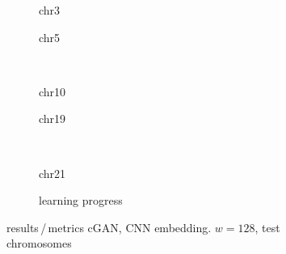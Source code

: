 \begin{figure}[p] %
    \begin{subfigure}{0.45\textwidth}
        \scriptsize
        \caption{chr3}
    \end{subfigure} \hfill
    \begin{subfigure}{0.45\textwidth}
        \scriptsize
        \caption{chr5}
    \end{subfigure}\\[5mm]
    \begin{subfigure}{0.45\textwidth}
        \scriptsize
        \caption{chr10}
    \end{subfigure}\hfill
    \begin{subfigure}{0.45\textwidth}
        \scriptsize
        \caption{chr19}
    \end{subfigure}\\[3mm]
    \centering
    \begin{subfigure}{0.45\textwidth}
        \scriptsize
        \caption{chr21}
    \end{subfigure} \hfill
    \begin{subfigure}{0.45\textwidth}
        \scriptsize
        \caption{learning progress} \label{fig:results:GAN128_lossEpochs}
    \end{subfigure}
    \caption{results\,/\,metrics cGAN, CNN embedding. $w=128$, test chromosomes}   \label{fig:results:GAN128_pearson}
\end{figure}
